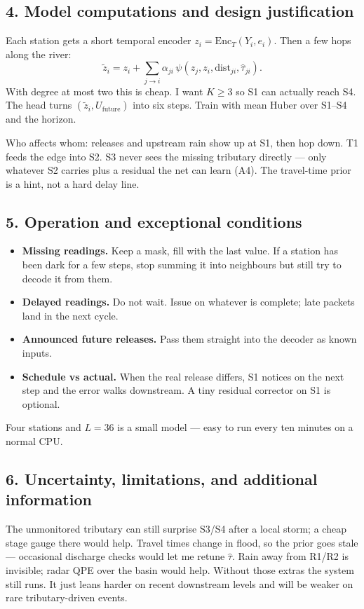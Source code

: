 \documentclass[11pt,a4paper]{article}
\begin{document}
\subsection{4. Model computations and design justification}

Each station gets a short temporal encoder $z_i=\mathrm{Enc}_T(Y_i,e_i)$. Then a few hops along the river:
\[
\tilde z_i = z_i + \sum_{j\to i}
\alpha_{ji}\,\psi(z_j,z_i,\mathrm{dist}_{ji},\hat\tau_{ji}).
\]
With degree at most two this is cheap. I want $K\ge 3$ so S1 can actually reach S4. The head turns $(\tilde z_i, U_{\mathrm{future}})$ into six steps. Train with mean Huber over S1--S4 and the horizon.

Who affects whom: releases and upstream rain show up at S1, then hop down. T1 feeds the edge into S2. S3 never sees the missing tributary directly --- only whatever S2 carries plus a residual the net can learn (A4). The travel-time prior is a hint, not a hard delay line.

\subsection{5. Operation and exceptional conditions}

\begin{itemize}[leftmargin=1.2em,itemsep=0.2em]
\item \textbf{Missing readings.} Keep a mask, fill with the last value. If a station has been dark for a few steps, stop summing it into neighbours but still try to decode it from them.
\item \textbf{Delayed readings.} Do not wait. Issue on whatever is complete; late packets land in the next cycle.
\item \textbf{Announced future releases.} Pass them straight into the decoder as known inputs.
\item \textbf{Schedule vs actual.} When the real release differs, S1 notices on the next step and the error walks downstream. A tiny residual corrector on S1 is optional.
\end{itemize}
Four stations and $L=36$ is a small model --- easy to run every ten minutes on a normal CPU.

\subsection{6. Uncertainty, limitations, and additional information}

The unmonitored tributary can still surprise S3/S4 after a local storm; a cheap stage gauge there would help. Travel times change in flood, so the prior goes stale --- occasional discharge checks would let me retune $\hat\tau$. Rain away from R1/R2 is invisible; radar QPE over the basin would help. Without those extras the system still runs. It just leans harder on recent downstream levels and will be weaker on rare tributary-driven events.
\end{document}

